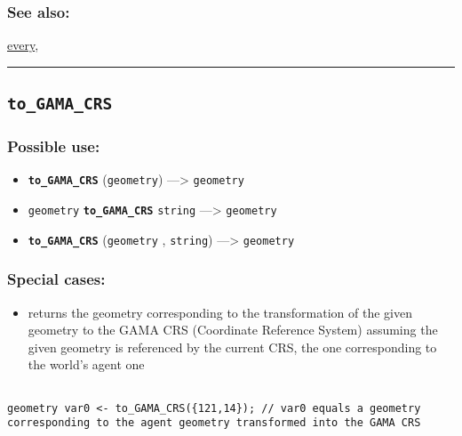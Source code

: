 \documentclass[]{book}
\providecommand{\tightlist}{%
  \setlength{\itemsep}{0pt}\setlength{\parskip}{0pt}}
\theoremstyle{definition}
\theoremstyle{definition}
\theoremstyle{definition}
\theoremstyle{remark}
\begin{document}
\subsubsection{See also:}\label{see-also-205}

\href{operators-d-to-h.html\#every}{every},

\begin{center}\rule{0.5\linewidth}{\linethickness}\end{center}

\subsection{\texorpdfstring{\texttt{to\_GAMA\_CRS}}{to\_GAMA\_CRS}}\label{to_gama_crs}

\subsubsection{Possible use:}\label{possible-use-520}

\begin{itemize}
\tightlist
\item
  \textbf{\texttt{to\_GAMA\_CRS}} (\texttt{geometry}) ---\textgreater{}
  \texttt{geometry}
\item
  \texttt{geometry} \textbf{\texttt{to\_GAMA\_CRS}} \texttt{string}
  ---\textgreater{} \texttt{geometry}
\item
  \textbf{\texttt{to\_GAMA\_CRS}} (\texttt{geometry} , \texttt{string})
  ---\textgreater{} \texttt{geometry}
\end{itemize}

\subsubsection{Special cases:}\label{special-cases-137}

\begin{itemize}
\tightlist
\item
  returns the geometry corresponding to the transformation of the given
  geometry to the GAMA CRS (Coordinate Reference System) assuming the
  given geometry is referenced by the current CRS, the one corresponding
  to the world's agent one
\end{itemize}

\begin{verbatim}
 
geometry var0 <- to_GAMA_CRS({121,14}); // var0 equals a geometry corresponding to the agent geometry transformed into the GAMA CRS
\end{verbatim}
\end{document}
